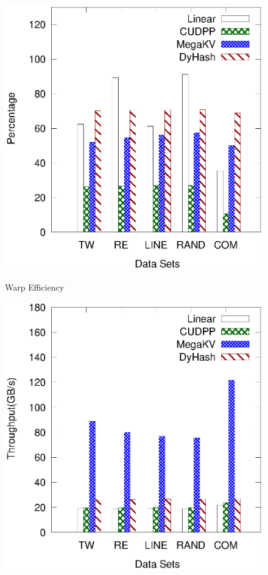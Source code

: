 \begin{figure}[t]
	\begin{minipage}{0.3\linewidth}\centering
		\includegraphics[width=\linewidth]{pic/static-profi/warp.eps}
		\centerline{Warp Efficiency}
	\end{minipage}
	\hfill
	\begin{minipage}{0.3\linewidth}\centering
		\includegraphics[width=\linewidth]{pic/static-profi/L2-read.eps}

\end{minipage}
\end{figure}
